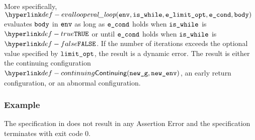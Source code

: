 More specifically, $\evalloop{\env, \iswhile, \velimitopt, \econd, \vbody}$
evaluates $\texttt{body}$ in $\texttt{env}$ as long as $\texttt{e\_cond}$ holds when $\texttt{is\_while}$ is $\True$
or until $\texttt{e\_cond}$ holds when $\texttt{is\_while}$ is $\False$.
If the number of iterations exceeds the optional value specified by $\texttt{limit\_opt}$,
the result is a dynamic error.
The result is either the continuing configuration \\ $\Continuing(\newg,\newenv)$,
an early return configuration, or an abnormal configuration.

\subsubsection{Example}
The specification in  does not result in any Assertion Error
and the specification terminates with exit code $0$.

